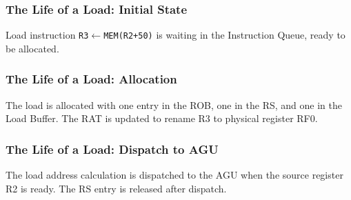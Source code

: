 \documentclass[aspectratio=169,12pt]{beamer}
\begin{document}
\begin{frame}
\frametitle{The Life of a Load: Initial State}
\begin{center}
\LoadLifecycleDiagram[
    iq1={\newentry{R3$\leftarrow$MEM(R2+50)}},
    lbAddr={Invalid},
    robDst={}
]
\end{center}
\vspace{-2mm}
\begin{tcolorbox}[colback=blue!5!white,colframe=blue!75!black]
Load instruction \texttt{R3$\leftarrow$MEM(R2+50)} is waiting in the Instruction Queue, ready to be allocated.
\end{tcolorbox}
\end{frame}

\begin{frame}
\frametitle{The Life of a Load: Allocation}
\begin{center}
\LoadLifecycleDiagram[
    rat3={RF0},
    robOp={Ld},
    robValid={1},
    robRdy={0},
    robData={X},
    iq1={R3$\leftarrow$MEM(R2+50)},
    rs1={RF0$\leftarrow$MEM(R2+50)},
    lbV={1},
    lbAddr={Invalid},
    lbBC={0}
]
\end{center}
\vspace{-2mm}
\begin{tcolorbox}[colback=blue!5!white,colframe=blue!75!black]
The load is allocated with one entry in the ROB, one in the RS, and one in the Load Buffer. The RAT is updated to rename R3 to physical register RF0.
\end{tcolorbox}
\end{frame}

\begin{frame}
\frametitle{The Life of a Load: Dispatch to AGU}
\begin{center}
\LoadLifecycleDiagram[
    rat3={RF0},
    robOp={Ld},
    robValid={1},
    robRdy={0},
    robData={X},
    iq1={R3$\leftarrow$MEM(R2+50)},
    lbV={1},
    lbAddr={Invalid},
    lbBC={0},
    agu={R2+50}
]
\end{center}
\vspace{-2mm}
\begin{tcolorbox}[colback=blue!5!white,colframe=blue!75!black]
The load address calculation is dispatched to the AGU when the source register R2 is ready. The RS entry is released after dispatch.
\end{tcolorbox}
\end{frame}
\end{document}
